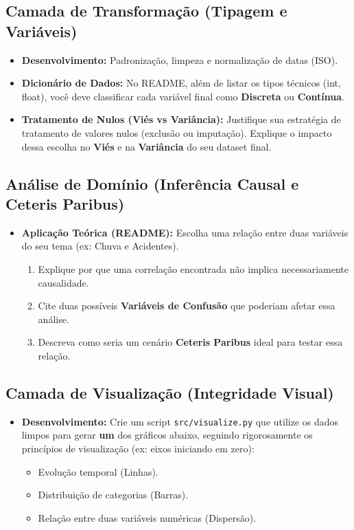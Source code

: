 \documentclass[12pt,a4paper]{article}
\begin{document}
	\subsection{Camada de Transformação (Tipagem e Variáveis)}
	\begin{itemize}
		\item \textbf{Desenvolvimento:} Padronização, limpeza e normalização de datas (ISO).
		\item \textbf{Dicionário de Dados:} No README, além de listar os tipos técnicos (int, float), você deve classificar cada variável final como \textbf{Discreta} ou \textbf{Contínua}.
		\item \textbf{Tratamento de Nulos (Viés vs Variância):} Justifique sua estratégia de tratamento de valores nulos (exclusão ou imputação). Explique o impacto dessa escolha no \textbf{Viés} e na \textbf{Variância} do seu dataset final.
	\end{itemize}

	\subsection{Análise de Domínio (Inferência Causal e Ceteris Paribus)}
	\begin{itemize}
		\item \textbf{Aplicação Teórica (README):} Escolha uma relação entre duas variáveis do seu tema (ex: Chuva e Acidentes). 
		\begin{enumerate}
			\item Explique por que uma correlação encontrada não implica necessariamente causalidade.
			\item Cite duas possíveis \textbf{Variáveis de Confusão} que poderiam afetar essa análise.
			\item Descreva como seria um cenário \textbf{Ceteris Paribus} ideal para testar essa relação.
		\end{enumerate}
	\end{itemize}

	\subsection{Camada de Visualização (Integridade Visual)}
	\begin{itemize}
		\item \textbf{Desenvolvimento:} Crie um script \texttt{src/visualize.py} que utilize os dados limpos para gerar \textbf{um} dos gráficos abaixo, seguindo rigorosamente os princípios de visualização (ex: eixos iniciando em zero):
		\begin{itemize}
			\item Evolução temporal (Linhas).
			\item Distribuição de categorias (Barras).
			\item Relação entre duas variáveis numéricas (Dispersão).
		\end{itemize}
	\end{itemize}
\end{document}
